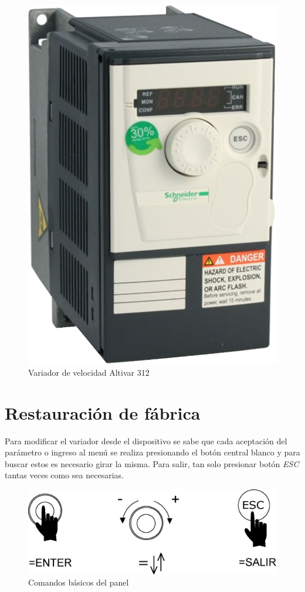 \documentclass[12pt,a4paper]{article}
\begin{document}
		\begin{figure}[h!]
			\centering
			\includegraphics[scale=0.4]{variador.eps}
			\caption{Variador de velocidad Altivar 312}
			\label{fig:variador}
		\end{figure}

		\section{Restauración de fábrica}
		Para modificar el variador desde el dispositivo se sabe que cada aceptación del parámetro o ingreso al menú se realiza presionando el botón central blanco y para buscar estos es necesario girar la misma. Para salir, tan solo presionar botón \textsl{ESC} tantas veces como sea necesarias. \\
			\begin{figure}[h!]
			\centering
			\includegraphics[scale=0.5]{ver2.eps}
			\caption{Comandos básicos del panel}
			\end{figure}
	
\end{document}
